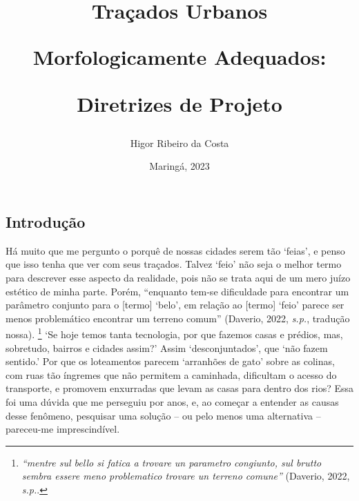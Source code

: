 \documentclass[12pt, a4paper]{book} %
\begin{document}
\frontmatter %

\title{Traçados Urbanos 

Morfologicamente Adequados:

Diretrizes de Projeto}

\author{Higor Ribeiro da Costa}
\date{Maringá, 2023}

    \maketitle

    \tableofcontents
    \listoffigures %
    \listoftables %


    \mainmatter %

    \onehalfspacing
    

    \part*{}

        \chapter*{Introdução}
        
        Há muito que me pergunto o porquê de nossas cidades serem tão `feias', e penso que isso tenha que ver com seus traçados. Talvez `feio' não seja o melhor termo para descrever esse aspecto da realidade, pois não se trata aqui de um mero juízo estético de minha parte. Porém, ``enquanto tem-se dificuldade para encontrar um parâmetro conjunto para o [termo] `belo', em relação ao [termo] `feio' parece ser menos problemático encontrar um terreno comum'' (Daverio, 2022, \textit{s.p.}, tradução nossa).
            \footnote[1]{\textit{``mentre sul bello si fatica a trovare un parametro congiunto, sul brutto sembra essere meno problematico trovare un terreno comune''} (Daverio, 2022, \textit{s.p.}.} 
        `Se hoje temos tanta tecnologia, por que fazemos casas e prédios, mas, sobretudo, bairros e cidades assim?' Assim `desconjuntados', que `não fazem sentido.' Por que os loteamentos parecem `arranhões de gato' sobre as colinas, com ruas tão íngremes que não permitem a caminhada, dificultam o acesso do transporte, e promovem enxurradas que levam as casas para dentro dos rios? Essa foi uma dúvida que me perseguiu por anos, e, ao começar a entender as causas desse fenômeno, pesquisar uma solução – ou pelo menos uma alternativa – pareceu-me imprescindível.
\end{document}
